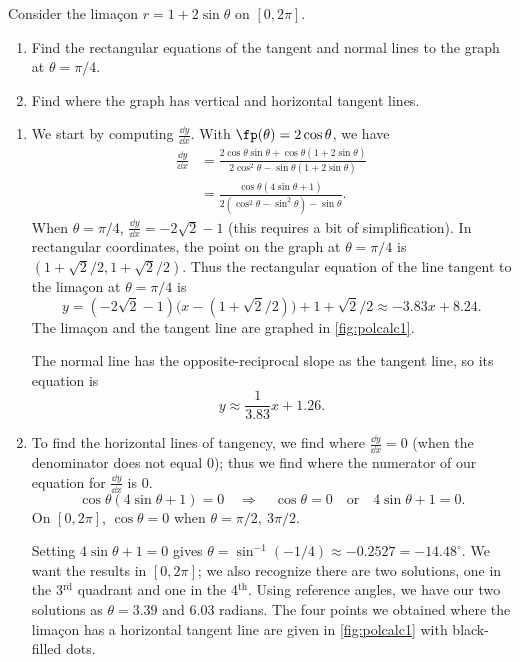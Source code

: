 
\begin{example}\label{ex_polcalc1}
Consider the limaçon $r=1+2\sin\theta$ on $[0,2\pi]$.
\begin{enumerate}
	\item	Find the rectangular equations of the tangent and normal lines to the graph at $\theta=\pi/4$.
	\item	Find where the graph has vertical and horizontal tangent lines.
\end{enumerate}
\solution
\begin{enumerate}
	\item We start by computing $\frac{\dd y}{\dd x}$. With $\fp(\theta) = 2\cos\theta$, we have
	\begin{align*}
	\frac{\dd y}{\dd x} &= \frac{2\cos\theta\sin\theta + \cos\theta(1+2\sin\theta)}{2\cos^2\theta-\sin\theta(1+2\sin\theta)}\\
	&= \frac{\cos\theta(4\sin\theta+1)}{2(\cos^2\theta-\sin^2\theta)-\sin\theta}.
	\end{align*}
	When $\theta=\pi/4$, $\frac{\dd y}{\dd x}=-2\sqrt{2}-1$ (this requires a bit of simplification). In rectangular coordinates, the point on the graph at $\theta=\pi/4$ is $(1+\sqrt{2}/2,1+\sqrt{2}/2)$. Thus the rectangular equation of the line tangent to the limaçon at $\theta=\pi/4$ is 
\[y=(-2\sqrt{2}-1)\bigl(x-(1+\sqrt{2}/2)\bigr)+1+\sqrt{2}/2 \approx  -3.83 x+8.24.\]
The limaçon and the tangent line are graphed in \autoref{fig:polcalc1}. 
	
	The normal line has the opposite-reciprocal slope as the tangent line, so its equation is 
\[y \approx \frac{1}{3.83}x+1.26.\]
	
	\item		To find the horizontal lines of tangency, we find where $\frac{\dd y}{\dd x}=0$ (when the denominator does not equal 0); thus we find where the numerator of our equation for $\frac{\dd y}{\dd x}$ is 0.
	\[\cos\theta(4\sin\theta+1)=0\quad \Rightarrow \quad \cos\theta=0 \quad \text{or}\quad 4\sin\theta+1=0.\]
	On $[0,2\pi]$, $\cos\theta=0$ when $\theta=\pi/2,\ 3\pi/2$. 

Setting $4\sin\theta+1=0$ gives $\theta=\sin^{-1}(-1/4)\approx -0.2527 = -14.48^\circ$. We want the results in $[0,2\pi]$; we also recognize there are two solutions, one in the 3$^\text{rd}$ quadrant and one in the 4$^\text{th}$. Using reference angles, we have our two solutions as $\theta =3.39$ and $6.03$ radians. The four points we obtained where the limaçon has a horizontal tangent line are given in \autoref{fig:polcalc1} with black-filled dots.\bigskip


\end{enumerate}
\end{example}
